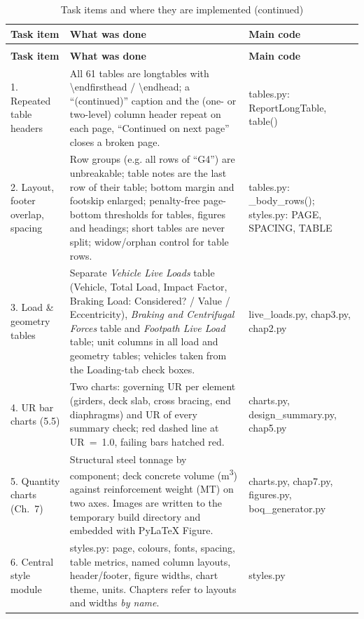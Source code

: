 \documentclass[10pt,a4paper]{article}
\newcommand{\file}[1]{{\footnotesize\ttfamily #1}}
\newcommand{\code}[1]{{\small\ttfamily #1}}
\begin{document}
\begin{longtable}{@{}L{0.19\textwidth}L{0.45\textwidth}L{0.30\textwidth}@{}}
\caption{Task items and where they are implemented}\label{tab:scope}\\
\toprule
\textbf{Task item} & \textbf{What was done} & \textbf{Main code} \\
\midrule
\endfirsthead
\caption[]{Task items and where they are implemented (continued)}\\
\toprule
\textbf{Task item} & \textbf{What was done} & \textbf{Main code} \\
\midrule
{}. Repeated table headers &
All 61 tables are \code{longtable}s with \code{\textbackslash endfirsthead} / \code{\textbackslash endhead}; a ``(continued)'' caption and the (one- or two-level) column header repeat on each page, ``Continued on next page'' closes a broken page. &
\file{tables.py}: \code{ReportLongTable}, \code{table()} \\
2. Layout, footer overlap, spacing &
Row groups (e.g. all rows of ``G4'') are unbreakable; table notes are the last row of their table; bottom margin and footskip enlarged; penalty-free page-bottom thresholds for tables, figures and headings; short tables are never split; widow/orphan control for table rows. &
\file{tables.py}: \code{\_body\_rows()}; \file{styles.py}: \code{PAGE}, \code{SPACING}, \code{TABLE} \\
3. Load \& geometry tables &
Separate \emph{Vehicle Live Loads} table (Vehicle, Total Load, Impact Factor, Braking Load: Considered? / Value / Eccentricity), \emph{Braking and Centrifugal Forces} table and \emph{Footpath Live Load} table; unit columns in all load and geometry tables; vehicles taken from the Loading-tab check boxes. &
\file{live\_loads.py}, \file{chap3.py}, \file{chap2.py} \\
4. UR bar charts (5.5) &
Two charts: governing UR per element (girders, deck slab, cross bracing, end diaphragms) and UR of every summary check; red dashed line at UR~=~1.0, failing bars hatched red. &
\file{charts.py}, \file{design\_summary.py}, \file{chap5.py} \\
5. Quantity charts (Ch.~7) &
Structural steel tonnage by component; deck concrete volume (m\textsuperscript{3}) against reinforcement weight (MT) on two axes. Images are written to the temporary build directory and embedded with PyLaTeX \code{Figure}. &
\file{charts.py}, \file{chap7.py}, \file{figures.py}, \file{boq\_generator.py} \\
6. Central style module &
\file{styles.py}: page, colours, fonts, spacing, table metrics, named column layouts, header/footer, figure widths, chart theme, units. Chapters refer to layouts and widths \emph{by name}. &
\file{styles.py} \\
\bottomrule
\end{longtable}
\end{document}
